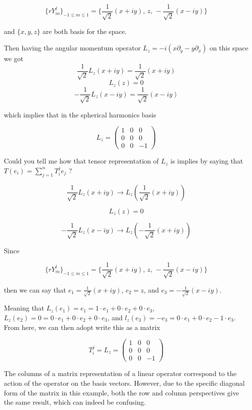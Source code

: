 $$
\{ r Y_{m}^{l} \}_{ -1 \leq m \leq 1 } =
\Big\{ \frac{1}{\sqrt{2}} (x +iy), \, z, \, - \frac{1}{\sqrt{2}} (x -iy) \Big\}
$$

and $\{ x, y, z \}$ are both basis for the space.

Then having the angular momentum operator $L_z = -i ( x\partial_y - y \partial_x )$ on this space we got
$$
\frac{1}{\sqrt{2}} L_z (x + iy) = \frac{1}{\sqrt{2}} (x + iy)
$$
$$
L_z (z) = 0
$$
$$
-\frac{1}{\sqrt{2}} L_z (x -iy) = \frac{1}{\sqrt{2}} (x -iy)
$$

which implies that in the spherical harmonics basis

$$
L_z = 
\begin{pmatrix}
1 & 0 & 0 \\
0 & 0 & 0 \\
0 & 0 & -1
\end{pmatrix}
$$

Could you tell me how that tensor representation of $L_z$ is implies by saying that
$T(e_i) = \sum^{n}_{j=1} T_{i}^{j} e_j$ ?


$$
\frac{1}{\sqrt{2}} L_z (x + iy)
\rightarrow
L_z \left( \frac{1}{\sqrt{2}} (x + iy) \right)
$$

$$
L_z (z) = 0
$$

$$
-\frac{1}{\sqrt{2}} L_z (x -iy)
\rightarrow
L_z \left( -\frac{1}{\sqrt{2}} (x + iy) \right)
$$

Since

$$
\{ r Y_{m}^{l} \}_{ -1 \leq m \leq 1 } =
\Big\{ \frac{1}{\sqrt{2}} (x +iy), \, z, \, - \frac{1}{\sqrt{2}} (x -iy) \Big\}
$$

then we can say that $e_1 = \frac{1}{\sqrt{2}} (x +iy)$, $e_2 = z$, and $e_3 = -\frac{1}{\sqrt{2}} (x -iy)$.

Meaning that $L_z (e_1) = e_1 = 1\cdot e_1 + 0\cdot e_2 + 0\cdot e_3$,
$L_z (e_2) = 0 = 0\cdot e_1 + 0\cdot e_2 + 0\cdot e_3$, and
$l_z (e_3) = -e_3 = 0\cdot e_1 + 0\cdot e_2 - 1\cdot e_3$.
From here, we can then adopt write this as a matrix

$$
T_{i}^{j}
=
L_z
=
\begin{pmatrix}
1 & 0 & 0 \\
0 & 0 & 0 \\
0 & 0 & -1
\end{pmatrix}
$$

The columns of a matrix representation of a linear operator correspond to the action of the operator on the basis vectors.
However, due to the specific diagonal form of the matrix in this example, both the row and column perspectives
give the same result, which can indeed be confusing.

